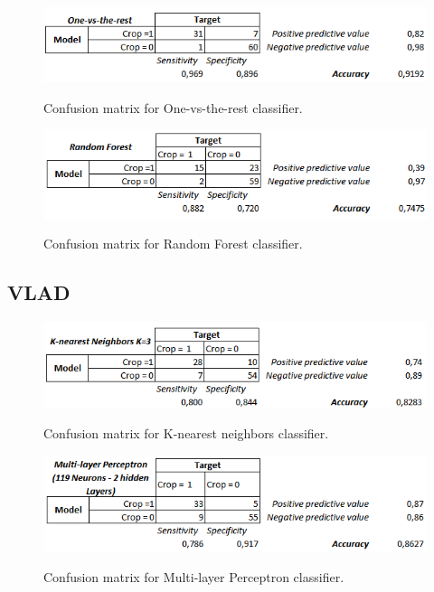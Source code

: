 \documentclass[12pt]{article}
\numberwithin{equation}{section}
\numberwithin{table}{section}
\numberwithin{figure}{section}
\begin{document}
\begin{figure}[H] \centering
	\caption{Confusion matrix for One-vs-the-rest classifier. }
	\includegraphics[width=1\textwidth]{m9.png}
	\label{m9}
\end{figure}

\begin{figure}[H] \centering
	\caption{Confusion matrix for Random Forest classifier. }
	\includegraphics[width=1\textwidth]{m10.png}
	\label{m10}
\end{figure}


\subsection{VLAD}

\begin{figure}[H] \centering
	\caption{Confusion matrix for K-nearest neighbors classifier. }
	\includegraphics[width=1\textwidth]{m11.png}
	\label{m11}
\end{figure}

\begin{figure}[H] \centering
	\caption{Confusion matrix for Multi-layer Perceptron classifier. }
	\includegraphics[width=1\textwidth]{m12.png}
	\label{m12}
\end{figure}
\end{document}
